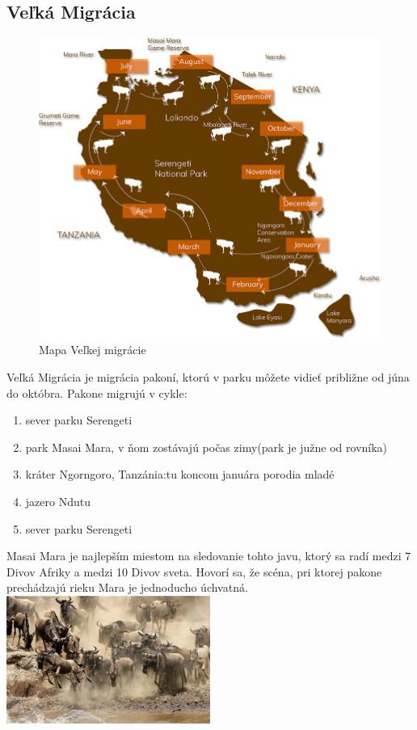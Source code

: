 \documentclass{article}
\begin{document}
\subsection{Veľká Migrácia}
\label{sec:gmwildebe}
\begin{figure}[t]
\includegraphics[scale=0.2]{map.png}
\caption{Mapa Veľkej migrácie}
\end{figure}
Veľká Migrácia je migrácia pakoní, ktorú v parku môžete vidieť približne od júna do októbra.
Pakone migrujú v cykle:
\begin{enumerate}
\item sever parku Serengeti
\item park Masai Mara, v ňom zostávajú počas zimy(park je južne od rovníka)
\item kráter Ngorngoro, Tanzánia:tu koncom januára porodia mladé
\item jazero Ndutu
\item sever parku Serengeti
\end{enumerate}
Masai Mara je najlepším miestom na sledovanie tohto javu, ktorý sa radí medzi 7 Divov Afriky a medzi 10 Divov sveta.
Hovorí sa, že scéna, pri ktorej pakone prechádzajú rieku Mara je jednoducho úchvatná.
\vskip 1cm
\includegraphics[width=0.5\textwidth,natwidth=200,natheight=200]{pakone-mara.jpg}\\
\end{document}

